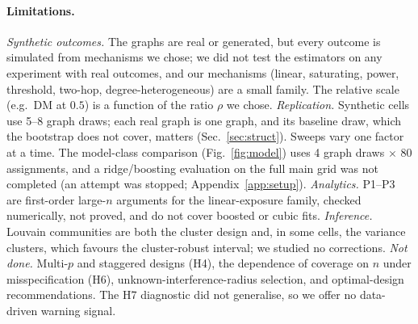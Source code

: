 \paragraph{Limitations.}
\emph{Synthetic outcomes.} The graphs are real or generated, but every outcome is simulated from mechanisms we chose; we did not test the estimators on any experiment with real outcomes, and our mechanisms (linear, saturating, power, threshold, two-hop, degree-heterogeneous) are a small family. The relative scale (e.g.\ DM at $0.5$) is a function of the ratio $\rho$ we chose. \emph{Replication.} Synthetic cells use 5--8 graph draws; each real graph is one graph, and its baseline draw, which the bootstrap does not cover, matters (Sec.~\ref{sec:struct}). Sweeps vary one factor at a time. The model-class comparison (Fig.~\ref{fig:model}) uses 4 graph draws $\times$ 80 assignments, and a ridge/boosting evaluation on the full main grid was not completed (an attempt was stopped; Appendix~\ref{app:setup}). \emph{Analytics.} P1--P3 are first-order large-$n$ arguments for the linear-exposure family, checked numerically, not proved, and do not cover boosted or cubic fits. \emph{Inference.} Louvain communities are both the cluster design and, in some cells, the variance clusters, which favours the cluster-robust interval; we studied no corrections. \emph{Not done.} Multi-$p$ and staggered designs (H4), the dependence of coverage on $n$ under misspecification (H6), unknown-interference-radius selection, and optimal-design recommendations. The H7 diagnostic did not generalise, so we offer no data-driven warning signal.
